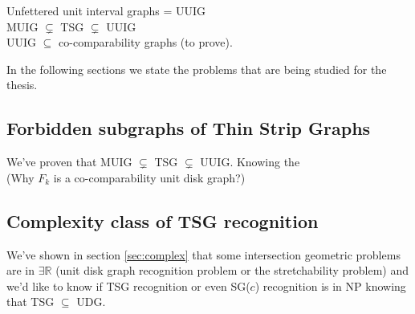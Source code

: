 Unfettered unit interval graphs = UUIG\\

MUIG $\subsetneq$ TSG $\subsetneq$ UUIG\\

UUIG $\subseteq$ co-comparability graphs (to prove).

In the following sections we state the problems that are being studied for the thesis.

\subsection{Forbidden subgraphs of Thin Strip Graphs}
  We've proven that MUIG $\subsetneq$ TSG $\subsetneq$ UUIG. Knowing the\\
  (Why $F_k$ is a co-comparability unit disk graph?)

\subsection{Complexity class of TSG recognition}
  We've shown in section \ref{sec:complex} that some intersection
  geometric problems are in $\exists \mathbb{R}$ (unit disk graph
  recognition problem or the stretchability problem) and we'd like to
  know if TSG recognition or even SG($c$) recognition is in NP knowing
  that TSG $\subseteq$ UDG.

